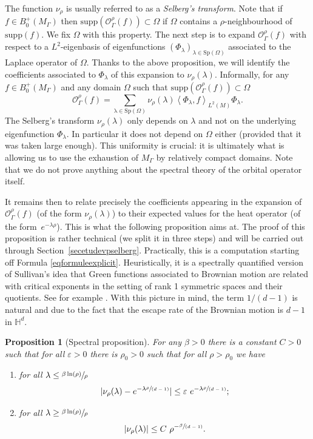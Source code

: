 \documentclass[JEP,XML,SOM,Unicode,NoFloatCountersInSection,published]{cedram}
\let\mathcal\mathscr
\let\epsilon\varepsilon
\newcommand{\spfrac}[2]{\sfrac{#1}{(#2)}}
\theoremstyle{plain}
\newtheorem{proposition}[equation]{Proposition}
\theoremstyle{definition}
\newcommand{\HH}{\mathbb{H}}
\newcommand{\supp}[1]{\mathrm{supp}(#1)}
\newcommand{\somme}[1]{\sum_{#1}}
\begin{document}
The function $\nu_{\rho}$ is usually referred to as a \emph{Selberg's transform}. Note that if $f \in B^+_0(M_{\Gamma})$ then $ \supp{ \mathcal{O}^{\rho}_{\Gamma}(f)} \subset \Omega$ if $\Omega$ contains a $\rho$-neighbourhood of $\supp{f}$. We fix $\Omega$ with this property. The next step is to expand $\mathcal{O}^{\rho}_{\Gamma}(f)$ with respect to a $L^2$-eigenbasis of eigenfunctions $(\Phi_{\lambda})_{\lambda \in \mathrm{Sp}(\Omega)}$ associated to the Laplace operator of $\Omega$. Thanks to the above proposition, we will identify the coefficients associated to $\Phi_{\lambda}$ of this expansion to $\nu_{\rho}(\lambda)$. Informally, for any $f \in B^+_0(M_{\Gamma})$ and any domain $\Omega$ such that $\supp{\mathcal{O}^{\rho}_{\Gamma}(f)} \subset \Omega$
\[
\mathcal{O}^{\rho}_{\Gamma}(f) = \somme{ \mathrm{\lambda \in Sp}(\Omega)} \nu_{\rho}(\lambda) \left< \Phi_{\lambda}, f \right>_{L^2(M)} \Phi_{\lambda}.
\]
The Selberg's transform $\nu_{\rho}(\lambda)$ only depends on $\lambda$ and not on the underlying eigenfunction $\Phi_{\lambda}$. In particular it does not depend on $\Omega$ either (provided that it was taken large enough). This uniformity is crucial: it is ultimately what is allowing us to use the exhaustion of $M_{\Gamma}$ by relatively compact domains. Note that we do not prove anything about the spectral theory of the orbital operator itself.

It remains then to relate precisely the coefficients appearing in the expansion of $\mathcal{O}^{\rho}_{\Gamma}(f)$ (of the form $\nu_{\rho}(\lambda)$) to their expected values for the heat operator (of the form~$e^{- \lambda \rho}$). This is what the following proposition aims at. The proof of this proposition is rather technical (we split it in three steps) and will be carried out through Section~\ref{secetudevpselberg}. Practically, this is a computation starting off Formula \eqref{eqformuleexplicit}. Heuristically, it is a spectrally quantified version of Sullivan's idea that Green functions associated to Brownian motion are related with critical exponents in the setting of rank 1 symmetric spaces and their quotients. See for example \cite{articlesullivanpositivity}. With this picture in mind, the term $1/(d-1)$ is natural and due to the fact that the escape rate of the Brownian motion is $d-1$ in $\HH^d$.

\begin{proposition}[Spectral proposition]
\label{propspectralprop}
For any $\beta >0$ there is a constant $C > 0$ such that for all $\epsilon > 0$ there is $\rho_0 > 0$ such that for all $\rho > \rho_0$ we have
\begin{enumerate}
\item for all $ \lambda \le \sfrac{\beta \ln (\rho) }{\rho} $
\[
| \nu_{\rho}(\lambda) - e^{-\lambda \spfrac{\rho}{d-1}}| \le \epsilon \ e^{ - \lambda \spfrac{\rho}{d-1}};
\]
\item for all $ \lambda \ge \sfrac{\beta \ln (\rho) }{\rho}$
\[
|\nu_{\rho}(\lambda)| \le C \ \rho^{-\spfrac{\beta}{d-1}}.
\]
\end{enumerate}
\end{proposition}
\end{document}
